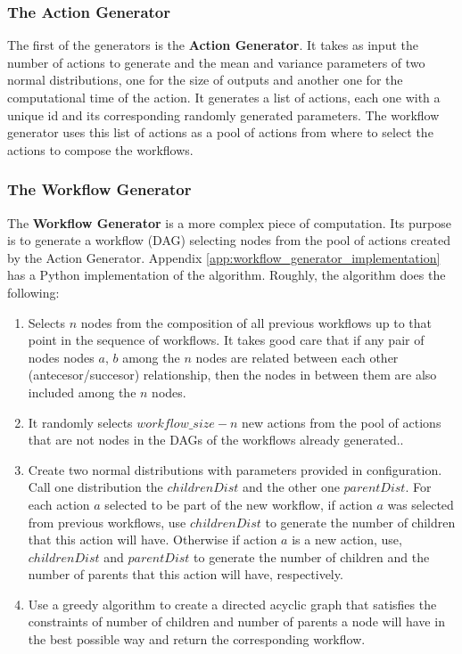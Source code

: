 \subsubsection{The Action Generator}
The first of the generators is the \textbf{Action Generator}.  It takes as input the number of actions to generate and the mean and variance parameters of two normal distributions, one for the size of outputs and another one for the computational time of the action.  It generates a list of actions, each one with a unique id and its corresponding randomly generated parameters. The workflow generator uses this list of actions as a pool of actions from where to select the actions to compose the workflows.

\subsubsection{The Workflow Generator}
The \textbf{Workflow Generator} is a more complex piece of computation.  Its purpose is to generate a workflow (DAG) selecting nodes from the pool of actions created by the Action Generator.  Appendix \ref{app:workflow_generator_implementation} has a Python implementation of the algorithm.  Roughly, the algorithm does the following:
\begin{enumerate}
\item Selects $n$ nodes from the composition of all previous workflows up to that point in the sequence of workflows. It takes good care that if any pair of nodes nodes $a$, $b$ among the $n$ nodes are related between each other (antecesor/succesor) relationship, then the nodes in between them are also included among the $n$ nodes.

\item It randomly selects $workflow\_size - n$ new actions from the pool of actions that are not nodes in the DAGs of the workflows already generated..

\item Create two normal distributions with parameters provided in configuration.  Call one distribution the $childrenDist$ and the other one $parentDist$. For each action $a$ selected to be part of the new workflow, if action $a$ was selected from previous workflows, use $childrenDist$ to generate the number of children that this action will have.  Otherwise if action $a$ is a new action, use, $childrenDist$ and $parentDist$ to generate the number of children and the number of parents that this action will have, respectively.

\item Use a greedy algorithm to create a directed acyclic graph that satisfies the constraints of number of children and number of parents a node will have in the best possible way and return the corresponding workflow.
\end{enumerate}

